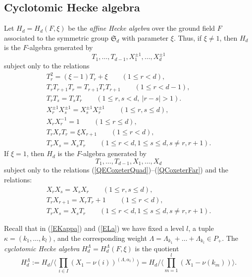 \documentclass[twoside,11pt,reqno]{amsart}
\numberwithin{equation}{section}
\theoremstyle{definition}  %
\newcommand{\0}{{\bar 0}}
\newcommand{\1}{{\bar 1}}
\newcommand{\La}{\Lambda}
\newcommand{\al}{\alpha}
\def\Si{\mathfrak{S}}
\begin{document}
\subsection{Cyclotomic Hecke algebra}
Let $H_d=H_d(F,\xi)$ be
the {\em affine Hecke algebra} over the ground field $F$ associated to the symmetric group $\Si_d$ with parameter $\xi$. 
Thus, if $\xi\neq 1$, then 
$H_d$ is the $F$-algebra generated by 
$$T_1,\dots,T_{d-1},X_1^{\pm 1}, \dots, X_d^{\pm 1}$$
subject only to the relations 
\begin{eqnarray}
\label{QECoxeterQuad}
T_r^2 = (\xi -1) T_r +\xi\qquad (1\leq r<d),\\
T_rT_{r+1}T_r=T_{r+1}T_rT_{r+1}\qquad(1\leq r<d-1),\label{QCoxeterClose}\\
T_rT_s=T_sT_r \qquad(1\leq r,s<d,\ |r-s|>1).\label{QCoxeterFar}
\\
X_r^{\pm1} X_s^{\pm1}=X_s^{\pm1} X_r^{\pm1}\qquad(1\leq r,s\leq d), \\ 
X_rX_r^{-1}=1\qquad(1\leq r\leq d),\\
T_r X_r T_r = \xi X_{r+1}\qquad(1\leq r< d),\\
T_r X_s = X_{s}T_r \qquad(1\leq r<d,1\leq s\leq d,s \neq r,r+1).%
\end{eqnarray}
If $\xi = 1$, then 
$H_d$ is the $F$-algebra generated by 
$$T_1,\dots,T_{d-1}, X_1,\dots,X_d$$ subject only to the relations (\ref{QECoxeterQuad})--(\ref{QCoxeterFar}) and the relations:
\begin{eqnarray}
X_rX_s=X_sX_r\qquad(1\leq r,s\leq d),
\\
\label{EDAHA}
T_r X_{r+1} = X_r T_r + 1\qquad(1\leq r< d),\\
\label{EDAHA2}
 T_r X_s = X_s T_r \qquad(1\leq r<d,1\leq s\leq d,s \neq r,r+1).
\end{eqnarray}


Recall that in (\ref{EKappa}) and (\ref{ELa}) we have fixed a level $l$, a tuple $\kappa=(k_1,\dots,k_l)$, and the corresponding weight $\La=\La_{k_1}+\dots+\La_{k_l}\in P_+$. 
The {\em cyclotomic Hecke algebra} $H_d^\La=H_d^\La(F,\xi)$ 
is the quotient 
\begin{equation}\label{ECHA}
H_d^\La := H_d \Big/ \big\langle \,\textstyle\prod_{i\in I}(X_1-\nu(i))^{(\La,\al_i)}\,\big\rangle= H_d\Big/\langle \textstyle\prod_{m=1}^l (X_1-\nu(k_m))\big\rangle.
\end{equation}
\end{document}
